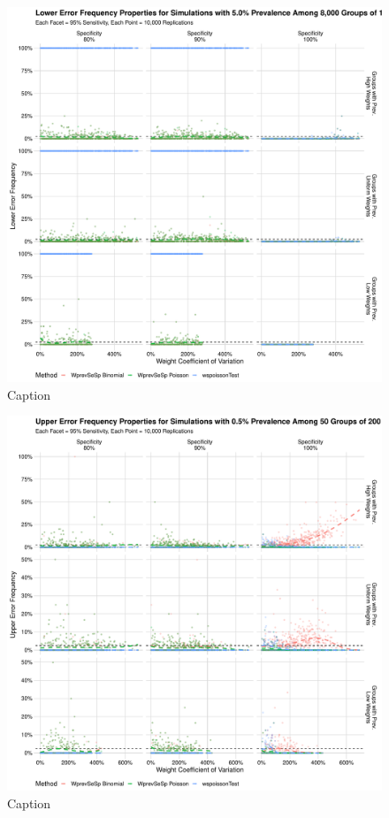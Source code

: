 \documentclass[AMA,STIX1COL]{WileyNJD-v2}
\begin{document}
\begin{figure}
\centering
\includegraphics[width=\textwidth]{figures/imperfect_lower_error_frequency_8000_groups_0_05_prev.pdf}
\caption{Caption}
\label{fig:imperfect_lower_error_frequency_8000_groups_0_05_prev}
\end{figure}

\begin{figure}
\centering
\includegraphics[width=\textwidth]{figures/imperfect_upper_error_frequency_50_groups_0_005_prev.pdf}
\caption{Caption}
\label{fig:imperfect_upper_error_frequency_50_groups_0_005_prev}
\end{figure}
\end{document}
